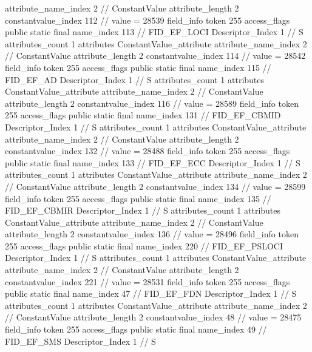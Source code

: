 {{{{{{{					attribute_name_index	2		// ConstantValue
					attribute_length	2
					constantvalue_index	112		// value = 28539
				}
				}
			}
			field_info {
				token	255
				access_flags	public static final
				name_index	113		// FID_EF_LOCI
				Descriptor_Index	1		// S
				attributes_count	1
				attributes {
				ConstantValue_attribute {
					attribute_name_index	2		// ConstantValue
					attribute_length	2
					constantvalue_index	114		// value = 28542
				}
				}
			}
			field_info {
				token	255
				access_flags	public static final
				name_index	115		// FID_EF_AD
				Descriptor_Index	1		// S
				attributes_count	1
				attributes {
				ConstantValue_attribute {
					attribute_name_index	2		// ConstantValue
					attribute_length	2
					constantvalue_index	116		// value = 28589
				}
				}
			}
			field_info {
				token	255
				access_flags	public static final
				name_index	131		// FID_EF_CBMID
				Descriptor_Index	1		// S
				attributes_count	1
				attributes {
				ConstantValue_attribute {
					attribute_name_index	2		// ConstantValue
					attribute_length	2
					constantvalue_index	132		// value = 28488
				}
				}
			}
			field_info {
				token	255
				access_flags	public static final
				name_index	133		// FID_EF_ECC
				Descriptor_Index	1		// S
				attributes_count	1
				attributes {
				ConstantValue_attribute {
					attribute_name_index	2		// ConstantValue
					attribute_length	2
					constantvalue_index	134		// value = 28599
				}
				}
			}
			field_info {
				token	255
				access_flags	public static final
				name_index	135		// FID_EF_CBMIR
				Descriptor_Index	1		// S
				attributes_count	1
				attributes {
				ConstantValue_attribute {
					attribute_name_index	2		// ConstantValue
					attribute_length	2
					constantvalue_index	136		// value = 28496
				}
				}
			}
			field_info {
				token	255
				access_flags	public static final
				name_index	220		// FID_EF_PSLOCI
				Descriptor_Index	1		// S
				attributes_count	1
				attributes {
				ConstantValue_attribute {
					attribute_name_index	2		// ConstantValue
					attribute_length	2
					constantvalue_index	221		// value = 28531
				}
				}
			}
			field_info {
				token	255
				access_flags	public static final
				name_index	47		// FID_EF_FDN
				Descriptor_Index	1		// S
				attributes_count	1
				attributes {
				ConstantValue_attribute {
					attribute_name_index	2		// ConstantValue
					attribute_length	2
					constantvalue_index	48		// value = 28475
				}
				}
			}
			field_info {
				token	255
				access_flags	public static final
				name_index	49		// FID_EF_SMS
				Descriptor_Index	1		// S
}}}}}
